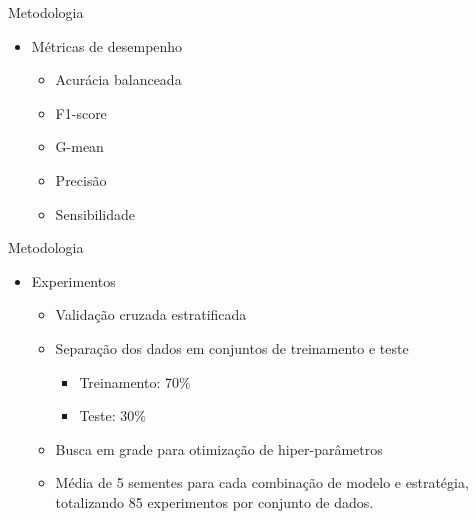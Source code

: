 \begin{frame}{Metodologia}
  \begin{itemize}
    \item[$\blacktriangleright$] Métricas de desempenho
      \begin{itemize}
        \item Acurácia balanceada~\cite{Naidu2023}
        \item F1-score
        \item G-mean~\cite{Namvar2018}
        \item Precisão
        \item Sensibilidade
      \end{itemize}
  \end{itemize}
\end{frame}

\begin{frame}{Metodologia}
  \begin{itemize}
    \item[$\blacktriangleright$] Experimentos
      \begin{itemize}
        \item Validação cruzada estratificada
        \item Separação dos dados em conjuntos de treinamento e teste
          \begin{itemize}
            \item Treinamento: 70\%
            \item Teste: 30\%
          \end{itemize}
        \item Busca em grade para otimização de hiper-parâmetros
        \item Média de 5 sementes para cada combinação de modelo e estratégia, totalizando 85 experimentos por conjunto de dados.
      \end{itemize}
  \end{itemize}
\end{frame}
